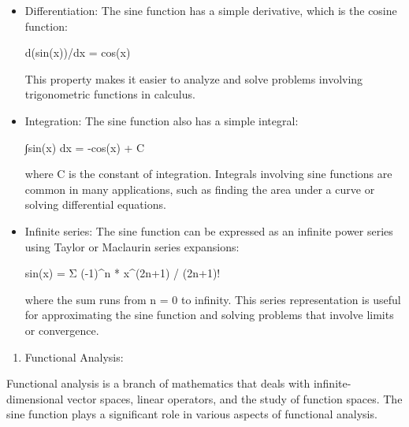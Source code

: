 \documentclass[
]{article}
\providecommand{\tightlist}{%
  \setlength{\itemsep}{0pt}\setlength{\parskip}{0pt}}
\begin{document}
\begin{itemize}
\item
  Differentiation: The sine function has a simple derivative, which is
  the cosine function:

  d(sin(x))/dx = cos(x)

  This property makes it easier to analyze and solve problems involving
  trigonometric functions in calculus.
\item
  Integration: The sine function also has a simple integral:

  ∫sin(x) dx = -cos(x) + C

  where C is the constant of integration. Integrals involving sine
  functions are common in many applications, such as finding the area
  under a curve or solving differential equations.
\item
  Infinite series: The sine function can be expressed as an infinite
  power series using Taylor or Maclaurin series expansions:

  sin(x) = Σ (-1)\^{}n * x\^{}(2n+1) / (2n+1)!

  where the sum runs from n = 0 to infinity. This series representation
  is useful for approximating the sine function and solving problems
  that involve limits or convergence.
\end{itemize}

\begin{enumerate}
\def\labelenumi{\arabic{enumi}.}
\setcounter{enumi}{1}
\tightlist
\item
  Functional Analysis:
\end{enumerate}

Functional analysis is a branch of mathematics that deals with
infinite-dimensional vector spaces, linear operators, and the study of
function spaces. The sine function plays a significant role in various
aspects of functional analysis.
\end{document}
